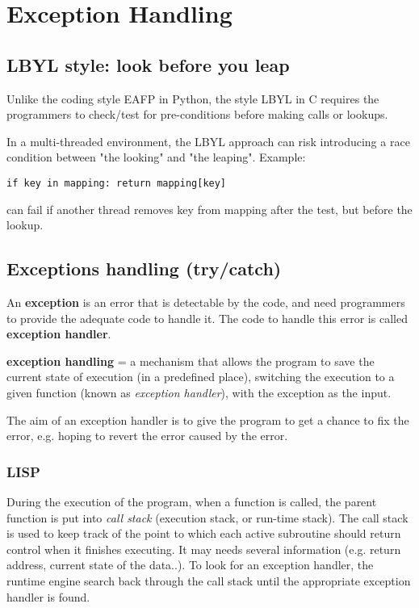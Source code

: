 \chapter{Exception Handling}
\label{chap:Exception_Handling_C-C++}

\section{LBYL style: look before you leap}
\label{sec:LBYL}

Unlike the coding style EAFP in Python, the style LBYL in C requires the
programmers to check/test for pre-conditions before making calls or lookups.

In a multi-threaded environment, the LBYL approach can risk introducing a race
condition between "the looking" and "the leaping".
Example:
\begin{verbatim}
if key in mapping: return mapping[key] 
\end{verbatim}
can fail if another thread removes key
from mapping after the test, but before the lookup.

\section{Exceptions handling (try/catch)}
\label{sec:exception-handling}

An {\bf exception} is an error that is detectable by the code, and need
programmers to provide the adequate code to handle it.
 The code to handle this error is called {\bf exception handler}.

{\bf exception handling} = a mechanism that allows the program to
  save the current state of execution (in a predefined place), switching the
  execution to a given function (known as {\it exception handler}), with the
  exception as the input.

  The aim of an exception handler is to give the program to get a chance to
  fix the error, e.g. hoping to revert the error caused by the error.

\subsection{LISP}

  During the execution of the program, when a function is called, the parent
  function is put into {\it call stack} (execution stack, or run-time stack).
  The call  stack is used to keep track of the point to which each active 
  subroutine should return control when it finishes executing. It may  needs
  several information (e.g. return address, current state of the data..). To
  look for an exception handler, the runtime engine search  back through the
  call stack until the appropriate exception handler  is found. 
  
